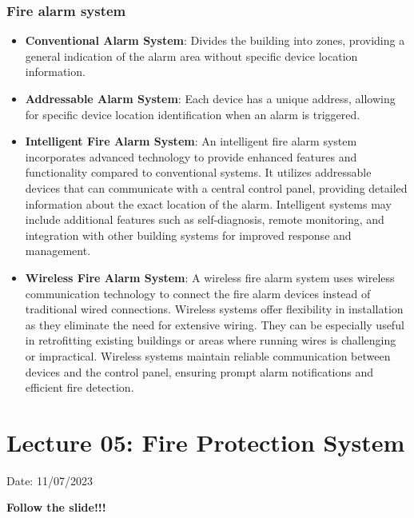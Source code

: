 \documentclass{article}
\begin{document}
\subsubsection*{Fire alarm system} 
\begin{itemize}
  \item \textbf{Conventional Alarm System}: Divides the building into zones, providing a general indication of the alarm area without specific device location information.

  \item \textbf{Addressable Alarm System}: Each device has a unique address, allowing for specific device location identification when an alarm is triggered.

  \item \textbf{Intelligent Fire Alarm System}: An intelligent fire alarm system incorporates advanced technology to provide enhanced features and functionality compared to conventional systems. It utilizes addressable devices that can communicate with a central control panel, providing detailed information about the exact location of the alarm. Intelligent systems may include additional features such as self-diagnosis, remote monitoring, and integration with other building systems for improved response and management.

  \item \textbf{Wireless Fire Alarm System}: A wireless fire alarm system uses wireless communication technology to connect the fire alarm devices instead of traditional wired connections. Wireless systems offer flexibility in installation as they eliminate the need for extensive wiring. They can be especially useful in retrofitting existing buildings or areas where running wires is challenging or impractical. Wireless systems maintain reliable communication between devices and the control panel, ensuring prompt alarm notifications and efficient fire detection.
\end{itemize}

\section{Lecture 05: Fire Protection System} 
\hfill Date: 11/07/2023

\textbf{Follow the slide!!!}
\vspace*{1cm}
\end{document}
